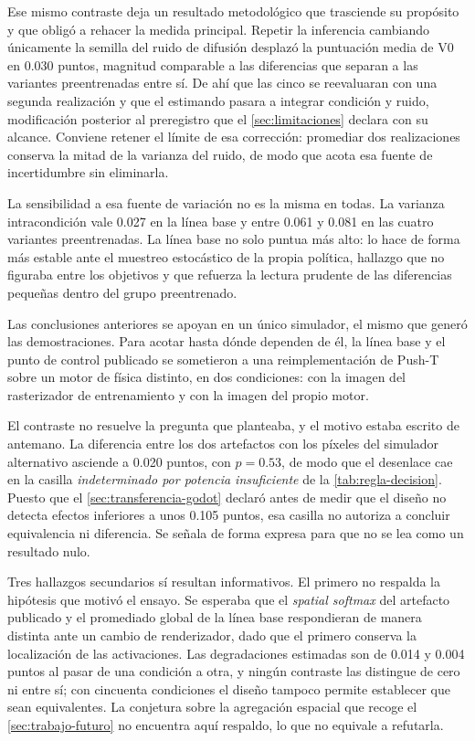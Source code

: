 Ese mismo contraste deja un resultado metodol\'ogico que trasciende su prop\'osito y que
oblig\'o a rehacer la medida principal. Repetir la inferencia cambiando \'unicamente la
semilla del ruido de difusi\'on desplaz\'o la puntuaci\'on media de V0 en \num{0.030}
puntos, magnitud comparable a las diferencias que separan a las variantes preentrenadas
entre s\'i. De ah\'i que las cinco se reevaluaran con una segunda realizaci\'on y que el
estimando pasara a integrar condici\'on y ruido, modificaci\'on posterior al preregistro que
el \cref{sec:limitaciones} declara con su alcance. Conviene retener el l\'imite de esa
correcci\'on: promediar dos realizaciones conserva la mitad de la varianza del ruido, de
modo que acota esa fuente de incertidumbre sin eliminarla.

La sensibilidad a esa fuente de variaci\'on no es la misma en todas. La varianza
intracondici\'on vale \num{0.027} en la l\'inea base y entre \num{0.061} y \num{0.081} en
las cuatro variantes preentrenadas. La l\'inea base no solo puntua m\'as alto: lo hace de
forma m\'as estable ante el muestreo estoc\'astico de la propia pol\'itica, hallazgo que no
figuraba entre los objetivos y que refuerza la lectura prudente de las diferencias
peque\~nas dentro del grupo preentrenado.


Las conclusiones anteriores se apoyan en un \'unico simulador, el mismo que gener\'o las
demostraciones. Para acotar hasta d\'onde dependen de \'el, la l\'inea base y el punto de
control publicado se sometieron a una reimplementaci\'on de Push-T sobre un motor de f\'isica
distinto, en dos condiciones: con la imagen del rasterizador de entrenamiento y con la imagen
del propio motor.

El contraste no resuelve la pregunta que planteaba, y el motivo estaba escrito de antemano.
La diferencia entre los dos artefactos con los p\'ixeles del simulador alternativo asciende a
\num{0.020} puntos, con $p = \num{0.53}$, de modo que el desenlace cae en la casilla
\emph{indeterminado por potencia insuficiente} de la \cref{tab:regla-decision}. Puesto que el
\cref{sec:transferencia-godot} declar\'o antes de medir que el dise\~no no detecta efectos
inferiores a unos \num{0.105} puntos, esa casilla no autoriza a concluir equivalencia ni
diferencia. Se se\~nala de forma expresa para que no se lea como un resultado nulo.

Tres hallazgos secundarios s\'i resultan informativos. El primero no respalda la hip\'otesis
que motiv\'o el ensayo. Se esperaba que el \textit{spatial softmax} del artefacto publicado y
el promediado global de la l\'inea base respondieran de manera distinta ante un cambio de
renderizador, dado que el primero conserva la localizaci\'on de las activaciones. Las
degradaciones estimadas son de \num{0.014} y \num{0.004} puntos al pasar de una condici\'on a
otra, y ning\'un contraste las distingue de cero ni entre s\'i; con cincuenta condiciones el
dise\~no tampoco permite establecer que sean equivalentes. La conjetura sobre la agregaci\'on
espacial que recoge el \cref{sec:trabajo-futuro} no encuentra aqu\'i respaldo, lo que no
equivale a refutarla.

